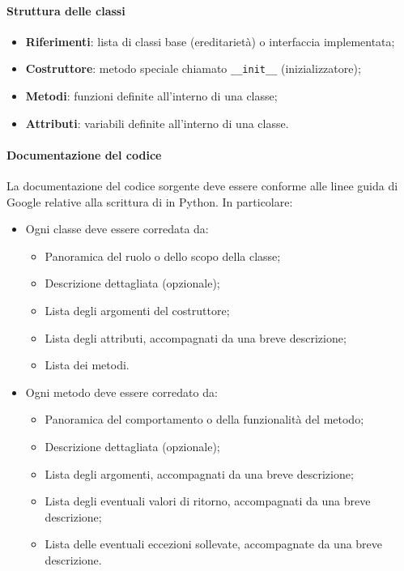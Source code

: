 \paragraph*{Struttura delle classi}
\begin{itemize}
  \item \textbf{Riferimenti}: lista di classi base (ereditarietà) o interfaccia implementata;
  \item \textbf{Costruttore}: metodo speciale chiamato \verb|__init__| (inizializzatore);
  \item \textbf{Metodi}: funzioni definite all'interno di una classe;
  \item \textbf{Attributi}: variabili definite all'interno di una classe.
\end{itemize}

\paragraph*{Documentazione del codice}
\vspace{0.5\baselineskip}
\par La documentazione del codice sorgente deve essere conforme alle linee guida di Google relative alla scrittura di  in Python. In particolare:
\begin{itemize}
  \item Ogni classe deve essere corredata da:
  \begin{itemize}
    \item Panoramica del ruolo o dello scopo della classe;
    \item Descrizione dettagliata (opzionale);
    \item Lista degli argomenti del costruttore;
    \item Lista degli attributi, accompagnati da una breve descrizione; 
    \item Lista dei metodi.
  \end{itemize}
  \item Ogni metodo deve essere corredato da:
  \begin{itemize}
    \item Panoramica del comportamento o della funzionalità del metodo;
    \item Descrizione dettagliata (opzionale);
    \item Lista degli argomenti, accompagnati da una breve descrizione; 
    \item Lista degli eventuali valori di ritorno, accompagnati da una breve descrizione;
    \item Lista delle eventuali eccezioni sollevate, accompagnate da una breve descrizione.
  \end{itemize}
\end{itemize}

